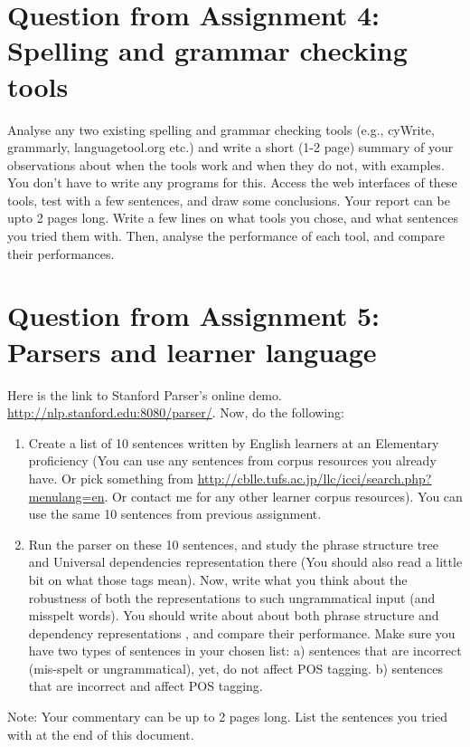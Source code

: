 \documentclass[11pt,a4paper]{article}
\begin{document}
\section*{Question from Assignment 4: Spelling and grammar checking tools} 
Analyse any two existing spelling and grammar checking tools (e.g., cyWrite, grammarly, languagetool.org etc.) and write a short (1-2 page) summary of your observations about when the tools work and when they do not, with examples. You don't have to write any programs for this. Access the web interfaces of these tools, test with a few sentences, and draw some conclusions. Your report can be upto 2 pages long. Write a few lines on what tools you chose, and what sentences you tried them with. Then, analyse the performance of each tool, and compare their performances. 

\section*{Question from Assignment 5: Parsers and learner language} 
Here is the link to Stanford Parser's online demo. \url{http://nlp.stanford.edu:8080/parser/}. Now, do the following:
\begin{enumerate}
\item Create a list of 10 sentences written by English learners at an Elementary proficiency (You can use any sentences from corpus resources you already have. Or pick something from \url{http://cblle.tufs.ac.jp/llc/icci/search.php?menulang=en}. Or contact me for any other learner corpus resources). You can use the same 10 sentences from previous assignment.
\item Run the parser on these 10 sentences, and study the phrase structure tree and Universal dependencies representation there (You should also read a little bit on what those tags mean). Now, write what you think about the robustness of both the representations to such ungrammatical input (and misspelt words). You should write about about both phrase structure and dependency representations , and compare their performance. Make sure you have two types of sentences in your chosen list: a) sentences that are incorrect (mis-spelt or ungrammatical), yet, do not affect POS tagging. b) sentences that are incorrect and affect POS tagging.
\end{enumerate}
Note: Your commentary can be up to 2 pages long. List the sentences you tried with at the end of this document. 
\end{document}
